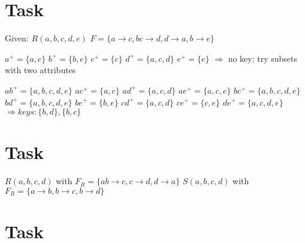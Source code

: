 \documentclass{article}
\begin{document}
\section{Task}
\par Given: \newline
$R(a, b, c, d, e)$ \newline
$F = \{  
        a \rightarrow c,
        bc \rightarrow d,
        d \rightarrow a,
        b \rightarrow e
    \}$
\par
$a^{+} = \{a, c \}$ \newline
$b^{+} = \{b, e \}$ \newline
$c^{+} = \{c \}$ \newline
$d^{+} = \{a, c, d \}$ \newline
$e^{+} = \{e \}$ \newline
$\Rightarrow$ no key: try subsets with two attributes

\par
$ab^{+} = \{a, b, c, d, e \}$ \newline
$ac^{+} = \{a, c \}$ \newline
$ad^{+} = \{a, c, d \}$ \newline
$ae^{+} = \{a, c, e \}$ \newline
$bc^{+} = \{a, b, c, d, e \}$ \newline
$bd^{+} = \{a, b, c, d, e \}$ \newline
$be^{+} = \{b, e \}$ \newline
$cd^{+} = \{a, c, d \}$ \newline
$ce^{+} = \{c, e \}$ \newline
$de^{+} = \{a, c, d, e \}$ \newline
$\Rightarrow keys: \{b, d\}, \{b, c\}$ 

\section{Task}
$R(a, b, c, d)$ with $F_{R} = \{ ab \rightarrow c, c \rightarrow d, d \rightarrow a \}$ \newline
$S(a, b, c, d)$ with $F_{R} = \{ a \rightarrow b, b \rightarrow c, b \rightarrow d \}$


\section{Task}
\end{document}
